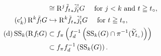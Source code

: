 \begin{Proposition+}
\begin{enumerate}[(i)]
\begin{align}
      &\cong
      \Rder[j]\tilde{f_{t}}_{\ast}\tilde{j}^{!}_{t}G
      \quad
      \text{ for \(j<k\) and \(t\geqq t_\circ\)},\\
      \tag{c\(_k'\)}
      \Rder[k]{\tilde{f}_{!}}G
      &\hookrightarrow
      \Rder[k]\tilde{f_{t}}_{\ast}\tilde{j}^{!}_{t}G
      \quad
      \text{ for \(t\geqq t_\circ\)},\\
      \tag{d}
      \muS[k](\Rder[]{f_{!}}G)
      &\subset
      \mpb[f]\left(\mdiff[f]^{-1}\left(
        \muS[k](G)\cap \pi^{-1}(\widetilde{Y}_{t_{\circ}})
      \right)\right)\\
      \notag&\subset\mpb[f]\mdiff[f]^{-1}\left(
        \muS[k](G)
      \right).
    \end{align}
  \end{enumerate}
\end{Proposition+}

